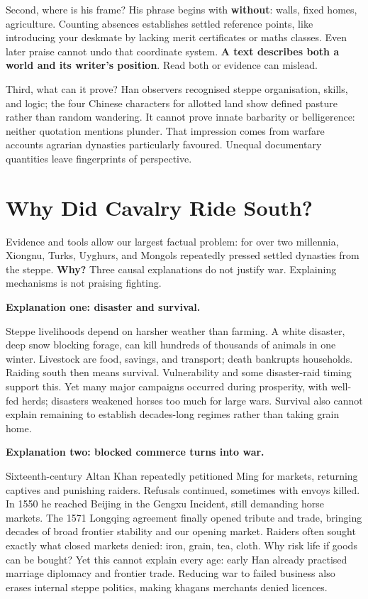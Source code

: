 Second, where is his frame? His phrase begins with \textbf{without}: walls, fixed homes, agriculture. Counting absences establishes settled reference points, like introducing your deskmate by lacking merit certificates or maths classes. Even later praise cannot undo that coordinate system. \textbf{A text describes both a world and its writer's position}. Read both or evidence can mislead.

Third, what can it prove? Han observers recognised steppe organisation, skills, and logic; the four Chinese characters for allotted land show defined pasture rather than random wandering. It cannot prove innate barbarity or belligerence: neither quotation mentions plunder. That impression comes from warfare accounts agrarian dynasties particularly favoured. Unequal documentary quantities leave fingerprints of perspective.

\section{Why Did Cavalry Ride South?}
Evidence and tools allow our largest factual problem: for over two millennia, Xiongnu, Turks, Uyghurs, and Mongols repeatedly pressed settled dynasties from the steppe. \textbf{Why?} Three causal explanations do not justify war. Explaining mechanisms is not praising fighting.

\textbf{Explanation one: disaster and survival.}

Steppe livelihoods depend on harsher weather than farming. A white disaster, deep snow blocking forage, can kill hundreds of thousands of animals in one winter. Livestock are food, savings, and transport; death bankrupts households. Raiding south then means survival. Vulnerability and some disaster-raid timing support this. Yet many major campaigns occurred during prosperity, with well-fed herds; disasters weakened horses too much for large wars. Survival also cannot explain remaining to establish decades-long regimes rather than taking grain home.

\textbf{Explanation two: blocked commerce turns into war.}

Sixteenth-century Altan Khan repeatedly petitioned Ming for markets, returning captives and punishing raiders. Refusals continued, sometimes with envoys killed. In 1550 he reached Beijing in the Gengxu Incident, still demanding horse markets. The 1571 Longqing agreement finally opened tribute and trade, bringing decades of broad frontier stability and our opening market. Raiders often sought exactly what closed markets denied: iron, grain, tea, cloth. Why risk life if goods can be bought? Yet this cannot explain every age: early Han already practised marriage diplomacy and frontier trade. Reducing war to failed business also erases internal steppe politics, making khagans merchants denied licences.


